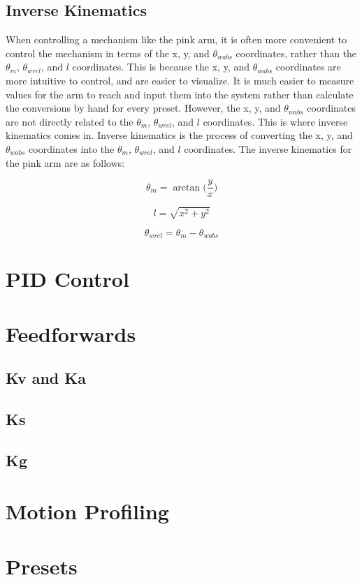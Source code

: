 \documentclass{scrartcl}
\begin{document}
\subsection{Inverse Kinematics}
When controlling a mechanism like the pink arm, it is often more convenient to control the mechanism in terms of the x, y, and \(\theta_{wabs}\) coordinates, rather than the \(\theta_m\), \(\theta_{wrel}\), and \(l\) coordinates. This is because the x, y, and \(\theta_{wabs}\) coordinates are more intuitive to control, and are easier to visualize. It is much easier to measure values for the arm to reach and input them into the system rather than calculate the conversions by hand for every preset. However, the x, y, and \(\theta_{wabs}\) coordinates are not directly related to the \(\theta_m\), \(\theta_{wrel}\), and \(l\) coordinates. This is where inverse kinematics comes in. Inverse kinematics is the process of converting the x, y, and \(\theta_{wabs}\) coordinates into the \(\theta_m\), \(\theta_{wrel}\), and \(l\) coordinates. The inverse kinematics for the pink arm are as follows:

\begin{equation} \label{theta_m}
    \theta_m = \arctan\biggl(\frac{y}{x}\biggl)
\end{equation}

\begin{equation} \label{l}
    l = \sqrt{x^2 + y^2}
\end{equation}

\begin{equation} \label{theta_wrel}
    \theta_{wrel} = \theta_m - \theta_{wabs}
\end{equation}

\section{PID Control}

\section{Feedforwards}
\subsection{Kv and Ka}
\subsection{Ks}
\subsection{Kg}

\section{Motion Profiling}

\section{Presets}
\end{document}
